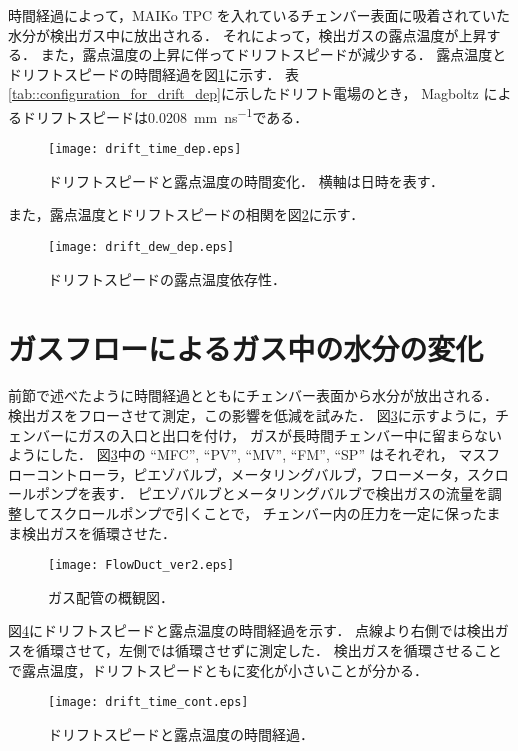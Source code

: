 \documentclass[../master]{subfiles}
\begin{document}
時間経過によって，MAIKo TPC を入れているチェンバー表面に吸着されていた水分が検出ガス中に放出される．
それによって，検出ガスの露点温度が上昇する．
また，露点温度の上昇に伴ってドリフトスピードが減少する．
露点温度とドリフトスピードの時間経過を図\ref{fig::drift_time_dep}に示す．
表\ref{tab::configuration_for_drift_dep}に示したドリフト電場のとき，
Magboltz によるドリフトスピードは\SI{0.0208}{\milli\metre\per\nano\second}である．
\begin{figure}
  \centering
  \texttt{[image: drift\_time\_dep.eps]}
  \caption[ドリフトスピードと露点温度の時間変化．]
          {ドリフトスピードと露点温度の時間変化．
          横軸は日時を表す．}
  \label{fig::drift_time_dep}
\end{figure}
また，露点温度とドリフトスピードの相関を図\ref{fig::drift_dew_dep}に示す．
\begin{figure}
  \centering
  \texttt{[image: drift\_dew\_dep.eps]}
  \caption{ドリフトスピードの露点温度依存性．}
  \label{fig::drift_dew_dep}
\end{figure}

\section{ガスフローによるガス中の水分の変化}
前節で述べたように時間経過とともにチェンバー表面から水分が放出される．
検出ガスをフローさせて測定，この影響を低減を試みた．
図\ref{fig::gas_duct}に示すように，チェンバーにガスの入口と出口を付け，
ガスが長時間チェンバー中に留まらないようにした．
図\ref{fig::gas_duct}中の ``MFC'', ``PV'', ``MV'', ``FM'', ``SP'' はそれぞれ，
マスフローコントローラ，ピエゾバルブ，メータリングバルブ，フローメータ，スクロールポンプを表す．
ピエゾバルブとメータリングバルブで検出ガスの流量を調整してスクロールポンプで引くことで，
チェンバー内の圧力を一定に保ったまま検出ガスを循環させた．
\begin{figure}
  \centering
  \texttt{[image: FlowDuct\_ver2.eps]}
  \caption{ガス配管の概観図．}
  \label{fig::gas_duct}
\end{figure}
図\ref{fig::drift_time_cont}にドリフトスピードと露点温度の時間経過を示す．
点線より右側では検出ガスを循環させて，左側では循環させずに測定した．
検出ガスを循環させることで露点温度，ドリフトスピードともに変化が小さいことが分かる．
\begin{figure}
  \centering
  \texttt{[image: drift\_time\_cont.eps]}
  \caption{ドリフトスピードと露点温度の時間経過．}
  \label{fig::drift_time_cont}
\end{figure}
\end{document}
